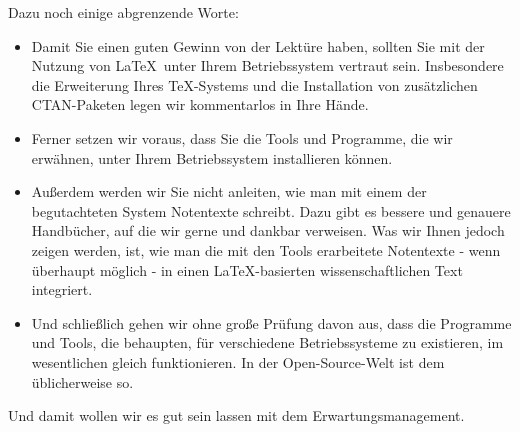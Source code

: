 Dazu noch einige abgrenzende Worte:
\begin{itemize}
  \item Damit Sie einen guten Gewinn von der Lektüre haben, sollten Sie mit der
  Nutzung von \LaTeX\ unter Ihrem Betriebssystem vertraut sein.
  Insbesondere die Erweiterung Ihres \TeX-Systems und die Installation von
  zusätzlichen CTAN-Paketen legen wir kommentarlos in Ihre Hände.
  \item Ferner setzen wir voraus, dass Sie die Tools und Programme, die wir
  erwähnen, unter Ihrem Betriebssystem installieren können.
  \item Außerdem werden wir Sie nicht anleiten, wie man mit einem der
  begutachteten System Notentexte schreibt. Dazu gibt es bessere und genauere
  Handbücher, auf die wir gerne und dankbar verweisen. Was wir Ihnen jedoch
  zeigen werden, ist, wie man die mit den Tools erarbeitete Notentexte - wenn
  überhaupt möglich - in einen \LaTeX-basierten wissenschaftlichen Text
  integriert.
  \item Und schließlich gehen wir ohne große Prüfung davon aus, dass die
  Programme und Tools, die behaupten, für verschiedene Betriebssysteme zu
  existieren, im wesentlichen gleich funktionieren. In der Open-Source-Welt ist
  dem üblicherweise so.
\end{itemize}

Und damit wollen wir es gut sein lassen mit dem Erwartungsmanagement.



%
